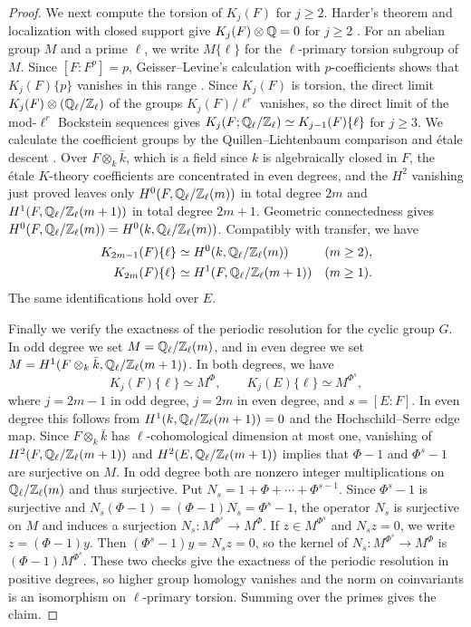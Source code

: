 \begin{proof}
We next compute the torsion of $K_j(F)$ for $j\ge2$.
Harder's theorem and localization with closed support give $K_j(F)\otimes\mathbb Q=0$ for $j\ge2$ \cite[Corollary 2.3.2]{Harder}.
For an abelian group $M$ and a prime $\ell$, we write $M\{\ell\}$ for the $\ell$-primary torsion subgroup of $M$.
Since $[F:F^p]=p$, Geisser--Levine's calculation with $p$-coefficients shows that $K_j(F)\{p\}$ vanishes in this range \cite{GeisserLevine}.
Since $K_j(F)$ is torsion, the direct limit $K_j(F)\otimes(\mathbb Q_\ell/\mathbb Z_\ell)$ of the groups $K_j(F)/\ell^r$ vanishes, so the direct limit of the mod-$\ell^r$ Bockstein sequences gives $K_j(F;\mathbb Q_\ell/\mathbb Z_\ell)\simeq K_{j-1}(F)\{\ell\}$ for $j\ge3$.
We calculate the coefficient groups by the Quillen--Lichtenbaum comparison and \'etale descent \cite{ClausenMathew}.
Over $F\otimes_k\bar k$, which is a field since $k$ is algebraically closed in $F$, the \'etale $K$-theory coefficients are concentrated in even degrees, and the $H^2$ vanishing just proved leaves only $H^0(F,\mathbb Q_\ell/\mathbb Z_\ell(m))$ in total degree $2m$ and $H^1(F,\mathbb Q_\ell/\mathbb Z_\ell(m+1))$ in total degree $2m+1$.
Geometric connectedness gives $H^0(F,\mathbb Q_\ell/\mathbb Z_\ell(m))=H^0(k,\mathbb Q_\ell/\mathbb Z_\ell(m))$.
Compatibly with transfer, we have
\[
 \begin{aligned}
 K_{2m-1}(F)\{\ell\}&\simeq H^0(k,\mathbb Q_\ell/\mathbb Z_\ell(m))       &&(m\ge2),\\
 K_{2m}(F)\{\ell\}&\simeq H^1(F,\mathbb Q_\ell/\mathbb Z_\ell(m+1))      &&(m\ge1).
 \end{aligned}
\]
The same identifications hold over $E$.

Finally we verify the exactness of the periodic resolution for the cyclic group $G$.
In odd degree we set $M=\mathbb Q_\ell/\mathbb Z_\ell(m)$, and in even degree we set $M=H^1(F\otimes_k\bar k,\mathbb Q_\ell/\mathbb Z_\ell(m+1))$.
In both degrees, we have
\[
 K_j(F)\{\ell\}\simeq M^\Phi,\qquad K_j(E)\{\ell\}\simeq M^{\Phi^s},
\]
where $j=2m-1$ in odd degree, $j=2m$ in even degree, and $s=[E:F]$.
In even degree this follows from $H^1(k,\mathbb Q_\ell/\mathbb Z_\ell(m+1))=0$ and the Hochschild--Serre edge map.
Since $F\otimes_k\bar k$ has $\ell$-cohomological dimension at most one, vanishing of $H^2(F,\mathbb Q_\ell/\mathbb Z_\ell(m+1))$ and $H^2(E,\mathbb Q_\ell/\mathbb Z_\ell(m+1))$ implies that $\Phi-1$ and $\Phi^s-1$ are surjective on $M$.
In odd degree both are nonzero integer multiplications on $\mathbb Q_\ell/\mathbb Z_\ell(m)$ and thus surjective.
Put $N_s=1+\Phi+\cdots+\Phi^{s-1}$.
Since $\Phi^s-1$ is surjective and $N_s(\Phi-1)=(\Phi-1)N_s=\Phi^s-1$, the operator $N_s$ is surjective on $M$ and induces a surjection $N_s\colon M^{\Phi^s}\to M^\Phi$.
If $z\in M^{\Phi^s}$ and $N_sz=0$, we write $z=(\Phi-1)y$.
Then $(\Phi^s-1)y=N_sz=0$, so the kernel of $N_s\colon M^{\Phi^s}\to M^\Phi$ is $(\Phi-1)M^{\Phi^s}$.
These two checks give the exactness of the periodic resolution in positive degrees, so higher group homology vanishes and the norm on coinvariants is an isomorphism on $\ell$-primary torsion.
Summing over the primes gives the claim.
\end{proof}

